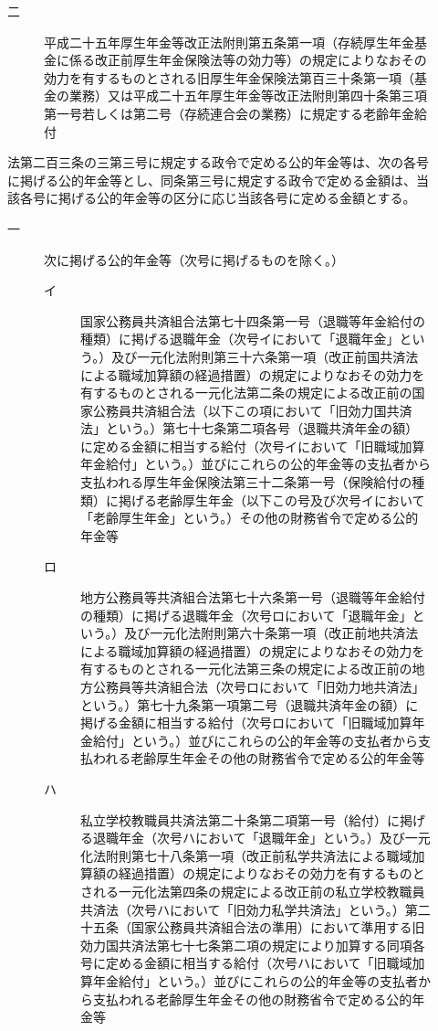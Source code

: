 \documentclass[twocolumn,a4j,10pt]{ltjtarticle}
\begin{document}
\begin{description}
\begin{description}
\begin{description}
\end{description}
\item[二]平成二十五年厚生年金等改正法附則第五条第一項（存続厚生年金基金に係る改正前厚生年金保険法等の効力等）の規定によりなおその効力を有するものとされる旧厚生年金保険法第百三十条第一項（基金の業務）又は平成二十五年厚生年金等改正法附則第四十条第三項第一号若しくは第二号（存続連合会の業務）に規定する老齢年金給付
\end{description}
\item[\rensuji{2}]法第二百三条の三第三号に規定する政令で定める公的年金等は、次の各号に掲げる公的年金等とし、同条第三号に規定する政令で定める金額は、当該各号に掲げる公的年金等の区分に応じ当該各号に定める金額とする。
\begin{description}
\item[一]次に掲げる公的年金等（次号に掲げるものを除く。）
\begin{description}
\item[イ]国家公務員共済組合法第七十四条第一号（退職等年金給付の種類）に掲げる退職年金（次号イにおいて「退職年金」という。）及び一元化法附則第三十六条第一項（改正前国共済法による職域加算額の経過措置）の規定によりなおその効力を有するものとされる一元化法第二条の規定による改正前の国家公務員共済組合法（以下この項において「旧効力国共済法」という。）第七十七条第二項各号（退職共済年金の額）に定める金額に相当する給付（次号イにおいて「旧職域加算年金給付」という。）並びにこれらの公的年金等の支払者から支払われる厚生年金保険法第三十二条第一号（保険給付の種類）に掲げる老齢厚生年金（以下この号及び次号イにおいて「老齢厚生年金」という。）その他の財務省令で定める公的年金等
\item[ロ]地方公務員等共済組合法第七十六条第一号（退職等年金給付の種類）に掲げる退職年金（次号ロにおいて「退職年金」という。）及び一元化法附則第六十条第一項（改正前地共済法による職域加算額の経過措置）の規定によりなおその効力を有するものとされる一元化法第三条の規定による改正前の地方公務員等共済組合法（次号ロにおいて「旧効力地共済法」という。）第七十九条第一項第二号（退職共済年金の額）に掲げる金額に相当する給付（次号ロにおいて「旧職域加算年金給付」という。）並びにこれらの公的年金等の支払者から支払われる老齢厚生年金その他の財務省令で定める公的年金等
\item[ハ]私立学校教職員共済法第二十条第二項第一号（給付）に掲げる退職年金（次号ハにおいて「退職年金」という。）及び一元化法附則第七十八条第一項（改正前私学共済法による職域加算額の経過措置）の規定によりなおその効力を有するものとされる一元化法第四条の規定による改正前の私立学校教職員共済法（次号ハにおいて「旧効力私学共済法」という。）第二十五条（国家公務員共済組合法の準用）において準用する旧効力国共済法第七十七条第二項の規定により加算する同項各号に定める金額に相当する給付（次号ハにおいて「旧職域加算年金給付」という。）並びにこれらの公的年金等の支払者から支払われる老齢厚生年金その他の財務省令で定める公的年金等

\end{description}
\end{description}
\end{description}
\end{document}
